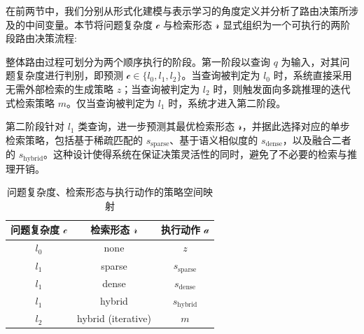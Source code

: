 在前两节中，我们分别从形式化建模与表示学习的角度定义并分析了路由决策所涉及的中间变量。本节将问题复杂度 $\mathcal{c}$ 与检索形态 $\mathcal{r}$ 显式组织为一个可执行的两阶段路由决策流程:

整体路由过程可划分为两个顺序执行的阶段。第一阶段以查询 $q$ 为输入，对其问题复杂度进行判别，即预测 $\mathcal{c} \in \{l_0, l_1, l_2\}$。当查询被判定为 $l_0$ 时，系统直接采用无需外部检索的生成策略 $z$；当查询被判定为 $l_2$ 时，则触发面向多跳推理的迭代式检索策略 $m$。仅当查询被判定为 $l_1$ 时，系统才进入第二阶段。

第二阶段针对 $l_1$ 类查询，进一步预测其最优检索形态 $\mathcal{r}$，并据此选择对应的单步检索策略，包括基于稀疏匹配的 $s_{\text{sparse}}$、基于语义相似度的 $s_{\text{dense}}$，以及融合二者的 $s_{\text{hybrid}}$。这种设计使得系统在保证决策灵活性的同时，避免了不必要的检索与推理开销。

\begin{table}[htbp]
    \centering
    \small
    \caption{问题复杂度、检索形态与执行动作的策略空间映射}
    \label{tab:strategy_mapping}
    \renewcommand{\arraystretch}{1.3}
    \begin{tabular}{c c c}
        \toprule
        \textbf{问题复杂度 $\mathcal{c}$} &
        \textbf{检索形态 $\mathcal{r}$} &
        \textbf{执行动作 $\mathcal{a}$} \\
        \midrule
        $l_0$ & none   & $z$ \\
        
        $l_1$ & sparse & $s_{\text{sparse}}$ \\
        $l_1$ & dense  & $s_{\text{dense}}$ \\
        $l_1$ & hybrid & $s_{\text{hybrid}}$ \\
        
        $l_2$ & hybrid (iterative) & $m$ \\
        \bottomrule
    \end{tabular}
\end{table}


